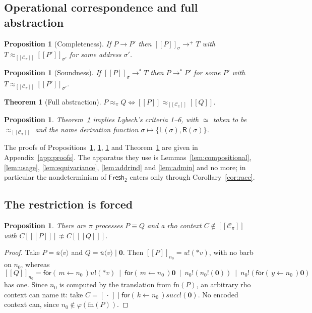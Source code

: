 \documentclass[11pt]{article}
\theoremstyle{definition}
\theoremstyle{plain}
\newtheorem{proposition}[definition]{Proposition}
\newtheorem{theorem}[definition]{Theorem}
\theoremstyle{remark}
\newcommand{\drp}[1]{{*}#1}
\newcommand{\inp}[3]{\mathsf{for}(\,#1 \leftarrow #2\,)#3}
\newcommand{\out}[2]{#1!(#2)}
\newcommand{\enc}[1]{[\![#1]\!]}
\newcommand{\nil}{\mathbf{0}}
\newcommand{\Lft}{\mathsf{L}}
\newcommand{\Rgt}{\mathsf{R}}
\newcommand{\Frsh}{\mathsf{Fresh}_2}
\newcommand{\Ctx}{\mathscr{C}}
\newcommand{\bisim}{\approx}
\newcommand{\fn}{\mathrm{fn}}
\begin{document}
\subsection{Operational correspondence and full abstraction}

\begin{proposition}[Completeness]\label{prop:complete}
If $P \to P'$ then $\enc{P}_\sigma \to^{+} T$ with
$T \bisim_{\enc{\Ctx_\pi}} \enc{P'}_{\sigma'}$ for some address
$\sigma'$.
\end{proposition}

\begin{proposition}[Soundness]\label{prop:sound}
If $\enc{P}_\sigma \to^* T$ then $P \to^* P'$ for some $P'$ with
$T \bisim_{\enc{\Ctx_\pi}} \enc{P'}_{\sigma'}$.
\end{proposition}

\begin{theorem}[Full abstraction]\label{thm:fullabs}
$P \bisim_\pi Q \iff \enc{P} \bisim_{\enc{\Ctx_\pi}} \enc{Q}$.
\end{theorem}

\begin{proposition}\label{prop:criteria}
Theorem~\ref{thm:fullabs} implies Lybech's criteria 1--6, with $\simeq$
taken to be $\bisim_{\enc{\Ctx_\pi}}$ and the name derivation function
$\sigma \mapsto \{\Lft(\sigma),\Rgt(\sigma)\}$.
\end{proposition}

The proofs of Propositions~\ref{prop:complete}, \ref{prop:sound},
\ref{prop:criteria} and Theorem~\ref{thm:fullabs} are given in
Appendix~\ref{app:proofs}. The apparatus they use is
Lemmas~\ref{lem:compositional}, \ref{lem:usage}, \ref{lem:equivariance},
\ref{lem:addrind} and \ref{lem:admin} and no more; in particular the
nondeterminism of $\Frsh$ enters only through
Corollary~\ref{cor:race}.

\subsection{The restriction is forced}\label{sec:necessity}

\begin{proposition}\label{prop:necessity}
There are $\pi$ processes $P \equiv Q$ and a rho context $C \notin
\enc{\Ctx_\pi}$ with $C[\enc{P}] \not\bisim C[\enc{Q}]$.
\end{proposition}

\begin{proof}
Take $P = \bar u\langle v\rangle$ and
$Q = \bar u\langle v\rangle \mid \nil$. Then
$\enc{P}_{n_0} = \out{u}{\drp{v}}$, with no barb on $n_0$, whereas
\[
\enc{Q}_{n_0} =
  \inp{m}{n_0}{\out{u}{\drp{v}}} \ \mid\ \inp{m}{n_0}{\nil}
  \ \mid\ \out{n_0}{\out{n_0}{\nil}} \ \mid\ \out{n_0}{\inp{y}{n_0}{\nil}}
\]
has one. Since $n_0$ is computed by the translation from $\fn(P)$, an
arbitrary rho context can name it: take
$C = [\,\cdot\,] \mid \inp{k}{n_0}{\out{\mathit{succ}}{\nil}}$. No
encoded context can, since $n_0 \notin \varphi(\fn(P))$.
\end{proof}
\end{document}
